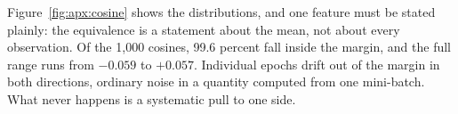 Figure~\ref{fig:apx:cosine} shows the distributions, and one feature must be stated plainly: the
equivalence is a statement about the mean, not about every observation.
Of the 1,000 cosines, 99.6
percent fall inside the margin, and the full range runs from $-0.059$ to $+0.057$. Individual epochs drift out of the margin in both
directions, ordinary noise in a quantity computed from one mini-batch. What never happens is a
systematic pull to one side.

